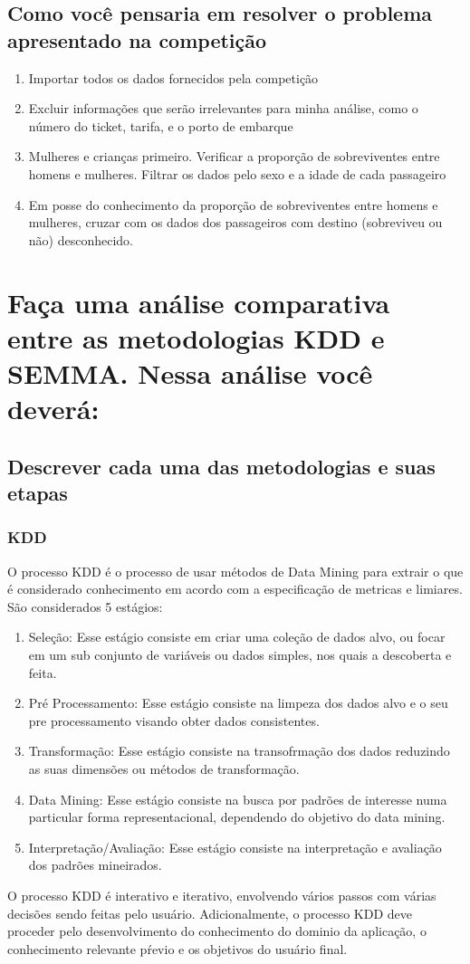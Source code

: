 \documentclass{article}
\begin{document}
\subsection{Como você pensaria em resolver o problema apresentado na competição}
\begin{enumerate}
    \item Importar todos os dados fornecidos pela competição
    \item Excluir informações que serão irrelevantes para minha análise, como o número do ticket, tarifa, e o porto de embarque
    \item Mulheres e crianças primeiro. Verificar a proporção de sobreviventes entre homens e mulheres. Filtrar os dados pelo sexo e a idade de cada passageiro
    \item Em posse do conhecimento da proporção de sobreviventes entre homens e mulheres, cruzar com os dados dos passageiros com destino (sobreviveu ou não) desconhecido.
\end{enumerate}


\section{Faça uma análise comparativa entre as metodologias KDD e SEMMA. Nessa análise você deverá:}
\subsection{Descrever cada uma das metodologias e suas etapas}
\subsubsection{KDD}
O processo KDD é o processo de usar métodos de Data Mining para extrair o que é considerado conhecimento em acordo com a especificação de metricas e limiares. São considerados 5 estágios:
\begin{enumerate}
    \item Seleção: Esse estágio consiste em criar uma coleção de dados alvo, ou focar em um sub conjunto de variáveis ou dados simples, nos quais a descoberta e feita.
    \item Pré Processamento: Esse estágio consiste na limpeza dos dados alvo e o seu pre processamento visando obter dados consistentes.
    \item Transformação: Esse estágio consiste na transofrmação dos dados reduzindo as suas dimensões ou métodos de transformação.
    \item Data Mining: Esse estágio consiste na busca por padrões de interesse numa particular forma representacional, dependendo do objetivo do data mining.
    \item Interpretação/Avaliação: Esse estágio consiste na interpretação e avaliação dos padrões mineirados.
\end{enumerate}
\noindent
O processo KDD é interativo e iterativo, envolvendo vários passos com várias decisões sendo feitas pelo usuário. Adicionalmente, o processo KDD deve proceder pelo desenvolvimento do conhecimento do dominio da aplicação, o conhecimento relevante pŕevio e os objetivos do usuário final.
\end{document}
